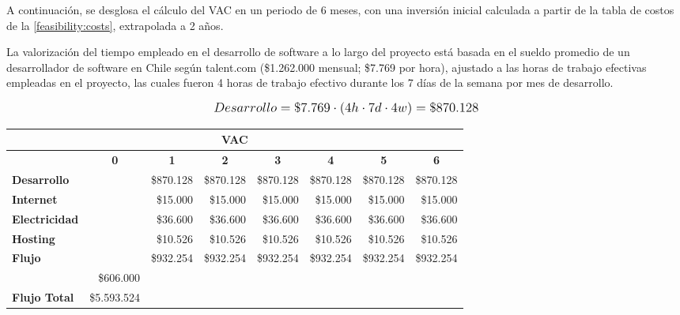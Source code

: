 A continuación, se desglosa el cálculo del VAC en un periodo de 6 meses, con una inversión inicial calculada a partir de la tabla de costos de la \autoref{feasibility:costs}, extrapolada a 2 años.

La valorización del tiempo empleado en el desarrollo de software a lo largo del proyecto está basada en el sueldo promedio de un desarrollador de software en Chile según talent.com (\$1.262.000 mensual; \$7.769 por hora), ajustado a las horas de trabajo efectivas empleadas en el proyecto, las cuales fueron 4 horas de trabajo efectivo durante los 7 días de la semana por mes de desarrollo.

\[
\mathlarger{
	Desarrollo = \$7.769 \cdot \left(4h\cdot7d\cdot4w\right) = \$870.128
}
\]


\begin{center}
	\begin{tabular}{ | l | l | l | l | l | l | l | l |}
		\hline
		\multicolumn{8}{|c|}{\textbf{VAC}} \\
		\hline
		 & \multicolumn{1}{|c|}{\textbf{0}} & \multicolumn{1}{|c|}{\textbf{1}} & \multicolumn{1}{|c|}{\textbf{2}} & \multicolumn{1}{|c|}{\textbf{3}} & \multicolumn{1}{|c|}{\textbf{4}} & \multicolumn{1}{|c|}{\textbf{5}} & \multicolumn{1}{|c|}{\textbf{6}} \\
		\hline
		{\textbf{Desarrollo}} &  & \multicolumn{1}{|r|}{\$870.128} & \multicolumn{1}{|r|}{\$870.128} & \multicolumn{1}{|r|}{\$870.128} & \multicolumn{1}{|r|}{\$870.128} & \multicolumn{1}{|r|}{\$870.128} & \multicolumn{1}{|r|}{\$870.128} \\ \hline
		
		{\textbf{Internet}} &  & \multicolumn{1}{|r|}{\$15.000} & \multicolumn{1}{|r|}{\$15.000} & \multicolumn{1}{|r|}{\$15.000} & \multicolumn{1}{|r|}{\$15.000} & \multicolumn{1}{|r|}{\$15.000} & \multicolumn{1}{|r|}{\$15.000} \\ \hline
		
		{\textbf{Electricidad}} &  & \multicolumn{1}{|r|}{\$36.600} & \multicolumn{1}{|r|}{\$36.600} & \multicolumn{1}{|r|}{\$36.600} & \multicolumn{1}{|r|}{\$36.600} & \multicolumn{1}{|r|}{\$36.600} & \multicolumn{1}{|r|}{\$36.600} \\ \hline
		
		{\textbf{Hosting}} &  & \multicolumn{1}{|r|}{\$10.526} & \multicolumn{1}{|r|}{\$10.526} & \multicolumn{1}{|r|}{\$10.526} & \multicolumn{1}{|r|}{\$10.526} & \multicolumn{1}{|r|}{\$10.526} & \multicolumn{1}{|r|}{\$10.526} \\ \hline
		
		{\textbf{Flujo}} &  & \multicolumn{1}{|r|}{\$932.254} & \multicolumn{1}{|r|}{\$932.254} & \multicolumn{1}{|r|}{\$932.254} & \multicolumn{1}{|r|}{\$932.254} & \multicolumn{1}{|r|}{\$932.254} & \multicolumn{1}{|r|}{\$932.254} \\ \hline
		& \multicolumn{1}{|r|}{\$606.000} & & & & & & \\ \hline
		\textbf{Flujo Total} & \multicolumn{1}{|r|}{\$5.593.524} & & & & & & \\ \hline
	\end{tabular}
\end{center}

